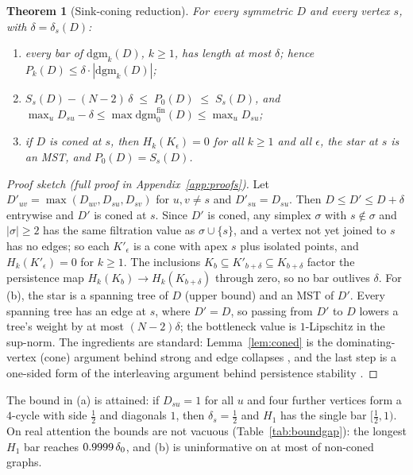 \documentclass{article}
\newtheorem{theorem}{Theorem}
\theoremstyle{definition}
\newcommand{\dgm}{\mathrm{dgm}}
\newcommand{\defect}{\delta}
\newcommand{\stw}{S}
\begin{document}
\begin{theorem}[Sink-coning reduction]
\label{thm:cone}
For every symmetric $D$ and every vertex $s$, with $\defect=\defect_s(D)$:
\begin{enumerate}[label=(\alph*),leftmargin=*]
\item every bar of $\dgm_k(D)$, $k\ge1$, has length at most $\defect$; hence $P_k(D)\le\defect\cdot|\dgm_k(D)|$;
\item $\stw_s(D)-(N-2)\,\defect\;\le\;P_0(D)\;\le\;\stw_s(D)$, and $\max_u D_{su}-\defect\le\max \dgm_0^{\text{fin}}(D)\le\max_u D_{su}$;
\item if $D$ is coned at $s$, then $H_k(K_\epsilon)=0$ for all $k\ge1$ and all $\epsilon$, the star at $s$ is an MST, and $P_0(D)=\stw_s(D)$.
\end{enumerate}
\end{theorem}

\begin{proof}[Proof sketch (full proof in Appendix~\ref{app:proofs})]
Let $D'_{uv}=\max(D_{uv},D_{su},D_{sv})$ for $u,v\ne s$ and $D'_{su}=D_{su}$. Then $D\le D'\le D+\defect$ entrywise and $D'$ is coned at $s$. Since $D'$ is coned, any simplex $\sigma$ with $s\notin\sigma$ and $|\sigma|\ge2$ has the same filtration value as $\sigma\cup\{s\}$, and a vertex not yet joined to $s$ has no edges; so each $K'_\epsilon$ is a cone with apex $s$ plus isolated points, and $H_k(K'_\epsilon)=0$ for $k\ge1$. The inclusions $K_b\subseteq K'_{b+\defect}\subseteq K_{b+\defect}$ factor the persistence map $H_k(K_b)\to H_k(K_{b+\defect})$ through zero, so no bar outlives $\defect$. For (b), the star is a spanning tree of $D$ (upper bound) and an MST of $D'$. Every spanning tree has an edge at $s$, where $D'=D$, so passing from $D'$ to $D$ lowers a tree's weight by at most $(N{-}2)\defect$; the bottleneck value is $1$-Lipschitz in the sup-norm. The ingredients are standard: Lemma~\ref{lem:coned} is the dominating-vertex (cone) argument behind strong and edge collapses \citep{barmak2012strong,boissonnat2020edge}, and the last step is a one-sided form of the interleaving argument behind persistence stability \citep{chazal2009proximity}.
\end{proof}

The bound in (a) is attained: if $D_{su}=1$ for all $u$ and four further vertices form a $4$-cycle with side $\tfrac12$ and diagonals $1$, then $\defect_s=\tfrac12$ and $H_1$ has the single bar $[\tfrac12,1)$. On real attention the bounds are not vacuous (Table~\ref{tab:boundgap}): the longest $H_1$ bar reaches $\GapUOneMax{}\,\defect_0$, and (b) is uninformative on at most \GapVacMax{} of non-coned graphs.
\end{document}
